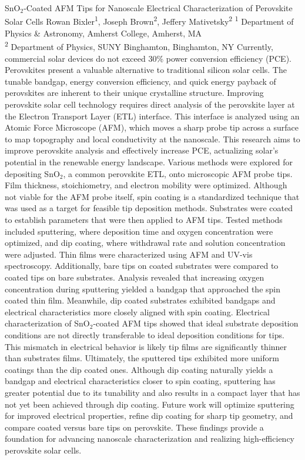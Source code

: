 \makeabstract
    {
    SnO\ensuremath{_2}-Coated AFM Tips for Nanoscale Electrical Characterization of Perovskite Solar Cells 
    }
    {
    Rowan Bixler\textsuperscript{1}, Joseph Brown\textsuperscript{2}, Jeffery Mativetsky\textsuperscript{2}
    }
    {
    \textsuperscript{1} Department of Physics \& Astronomy, Amherst College, Amherst, MA\\
\textsuperscript{2} Department of Physics, SUNY Binghamton, Binghamton, NY
    }
    {
    Currently, commercial solar devices do not exceed 30\% power conversion efficiency (PCE). Perovskites present a valuable alternative to traditional silicon solar cells. The tunable bandgap, energy conversion efficiency, and quick energy payback of perovskites are inherent to their unique crystalline structure. Improving perovskite solar cell technology requires direct analysis of the perovskite layer at the Electron Transport Layer (ETL) interface. This interface is analyzed using an Atomic Force Microscope (AFM), which moves a sharp probe tip across a surface to map topography and local conductivity at the nanoscale. This research aims to improve perovskite analysis and effectively increase PCE, actualizing solar{\textquoteright}s potential in the renewable energy landscape.
    }
    {
    Various methods were explored for depositing SnO\ensuremath{_2}, a common perovskite ETL, onto microscopic AFM probe tips. Film thickness, stoichiometry, and electron mobility were optimized. Although not viable for the AFM probe itself, spin coating is a standardized technique that was used as a target for feasible tip deposition methods. Substrates were coated to establish parameters that were then applied to AFM tips. Tested methods included sputtering, where deposition time and oxygen concentration were optimized, and dip coating, where withdrawal rate and solution concentration were adjusted. Thin films were characterized using AFM and UV-vis spectroscopy. Additionally, bare tips on coated substrates were compared to coated tips on bare substrates.
    }
    {
    Analysis revealed that increasing oxygen concentration during sputtering yielded a bandgap that approached the spin coated thin film. Meanwhile, dip coated substrates exhibited bandgaps and electrical characteristics more closely aligned with spin coating. Electrical characterization of SnO\ensuremath{_2}-coated AFM tips showed that ideal substrate deposition conditions are not directly transferable to ideal deposition conditions for tips. This mismatch in electrical behavior is likely tip films are significantly thinner than substrates films. Ultimately, the sputtered tips exhibited more uniform coatings than the dip coated ones.
    }
    {
    Although dip coating naturally yields a bandgap and electrical characteristics closer to spin coating, sputtering has greater potential due to its tunability and also results in a compact layer that has not yet been achieved through dip coating. Future work will optimize sputtering for improved electrical properties, refine dip coating for sharp tip geometry, and compare coated versus bare tips on perovskite. These findings provide a foundation for advancing nanoscale characterization and realizing high-efficiency perovskite solar cells.
    }

    \newpage
    